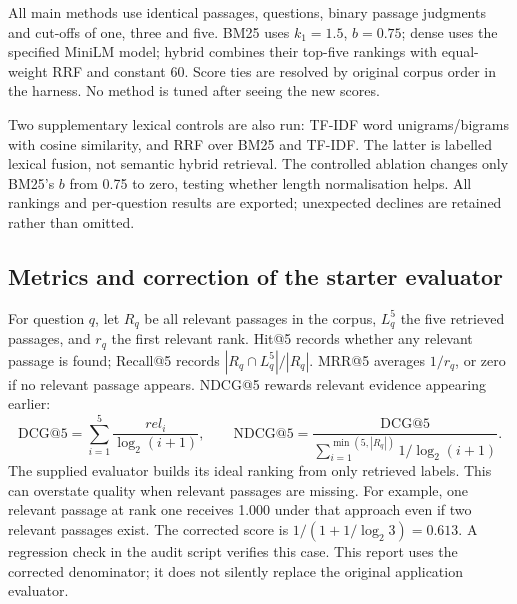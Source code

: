 \documentclass[11pt,a4paper]{article}
\begin{document}
All main methods use identical passages, questions, binary passage judgments and cut-offs of one, three and five. BM25 uses $k_1=1.5$, $b=0.75$; dense uses the specified MiniLM model; hybrid combines their top-five rankings with equal-weight RRF and constant 60. Score ties are resolved by original corpus order in the harness. No method is tuned after seeing the new scores.

Two supplementary lexical controls are also run: TF-IDF word unigrams/bigrams with cosine similarity, and RRF over BM25 and TF-IDF. The latter is labelled lexical fusion, not semantic hybrid retrieval. The controlled ablation changes only BM25's $b$ from 0.75 to zero, testing whether length normalisation helps. All rankings and per-question results are exported; unexpected declines are retained rather than omitted.

\subsection{Metrics and correction of the starter evaluator}
For question $q$, let $R_q$ be all relevant passages in the corpus, $L_q^5$ the five retrieved passages, and $r_q$ the first relevant rank. Hit@5 records whether any relevant passage is found; Recall@5 records $|R_q\cap L_q^5|/|R_q|$. MRR@5 averages $1/r_q$, or zero if no relevant passage appears. NDCG@5 rewards relevant evidence appearing earlier:
\begin{equation}
\mathrm{DCG@5}=\sum_{i=1}^{5}\frac{rel_i}{\log_2(i+1)},\qquad
\mathrm{NDCG@5}=\frac{\mathrm{DCG@5}}{\sum_{i=1}^{\min(5,|R_q|)}1/\log_2(i+1)}.
\end{equation}
The supplied evaluator builds its ideal ranking from only retrieved labels. This can overstate quality when relevant passages are missing. For example, one relevant passage at rank one receives 1.000 under that approach even if two relevant passages exist. The corrected score is $1/(1+1/\log_2 3)=0.613$. A regression check in the audit script verifies this case. This report uses the corrected denominator; it does not silently replace the original application evaluator.
\end{document}

